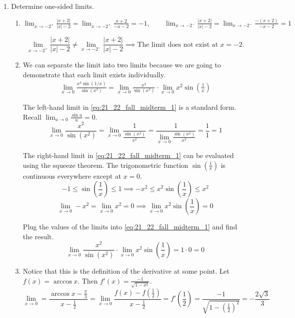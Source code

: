 \documentclass[a4paper, 12pt]{article}
\begin{document}
\begin{enumerate}[leftmargin=*,label=\textbf{\arabic*.}]
\item Determine one-sided limits.
\begin{enumerate}[leftmargin=*,label=\textbf{\alph*.}]
\item $\displaystyle\lim_{x\to-2^+}\frac{\left|x+2\right|}{\left|x\right|-2}=\lim_{x\to-2^+}\frac{x+2}{-x-2}=-1,\quad\quad\lim_{x\to-2^-}\frac{\left|x+2\right|}{\left|x\right|-2}=\lim_{x\to-2^-}\frac{-(x+2)}{-x-2}=1$

\[\lim_{x\to-2^+}\frac{\left|x+2\right|}{\left|x\right|-2}\neq\lim_{x\to-2^-}\frac{\left|x+2\right|}{\left|x\right|-2}\implies\boxed{\text{The limit does not exist at }x=-2.}\]

\item We can separate the limit into two limits because we are going to demonstrate that each limit exists individually.
\begin{align}\lim_{x\to0}\frac{x^4\sin(1/x)}{\sin\left(x^2\right)}=\lim_{x\to0}\frac{x^2}{\sin\left(x^2\right)}\cdot\lim_{x\to0}x^2\sin\left(\frac1x\right)\label{eq:21_22_fall_midterm_1}\end{align}

The left-hand limit in \eqref{eq:21_22_fall_midterm_1} is a standard form. Recall $\displaystyle\lim_{u\to0}\frac{\sin u}u=0$.
\[\lim_{x\to0}\frac{x^2}{\sin\left(x^2\right)}=\lim_{x\to0}\frac1{\displaystyle\frac{\sin\left(x^2\right)}{x^2}}=\frac1{\displaystyle\lim_{x\to 0}\frac{\sin\left(x^2\right)}{x^2}}=\frac11=1\]

The right-hand limit in \eqref{eq:21_22_fall_midterm_1} can be evaluated using the squeeze theorem. The trigonometric function $\displaystyle\sin\left(\frac1x\right)$ is continuous everywhere except at $x=0$.
\[-1\leq\sin\left(\frac1x\right)\leq1\implies -x^2\leq x^2\sin\left(\frac1x\right)\leq x^2\]
\[\lim_{x\to0}-x^2=\lim_{x\to0}x^2=0\implies\lim_{x\to0}x^2\sin\left(\frac1x\right)=0\]

Plug the values of the limits into \eqref{eq:21_22_fall_midterm_1} and find the result.
\[\lim_{x\to0}\frac{x^2}{\sin\left(x^2\right)}\cdot\lim_{x\to0}x^2\sin\left(\frac1x\right)=1\cdot0=\boxed0\]

\item Notice that this is the definition of the derivative at some point. Let $f(x)=\arccos x$. Then $\displaystyle f'(x) =\frac{-1}{\sqrt{1-x^2}}$.
\[\lim_{x\to0}=\frac{\arccos x -\frac\pi3}{x-\frac12}=\lim_{x\to0}\frac{f(x)-f\left(\frac12\right)}{x-\frac12}=f'\left(\frac12\right)=\frac{-1}{\sqrt{1-\left(\frac12\right)^2}}=\boxed{-\frac{2\sqrt3}{3}}\]
\end{enumerate}


\end{enumerate}
\end{document}
